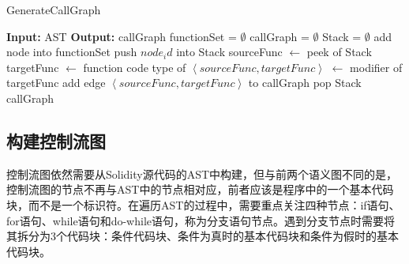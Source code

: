 \begin{algorithm}
    \caption{GenerateCallGraph}
    \label{alg:gen_callgraph}
    \begin{algorithmic}[1]
        \State \textbf{Input:} AST
        \State \textbf{Output:} callGraph
        \State functionSet = $\emptyset$
        \State callGraph = $\emptyset$
        \State Stack = $\emptyset$
                \State add node into functionSet
                \State push $node_id$ into Stack
                    \State sourceFunc $\gets$ peek of Stack
                    \State targetFunc $\gets$ function code
                    \State type of $\left\langle sourceFunc,targetFunc\right\rangle$ $\gets$ modifier of targetFunc
                    \State add edge  $\left\langle sourceFunc,targetFunc\right\rangle$ to callGraph
                \EndIf
            \EndIf
                \State {}
            \EndFor
                \State pop Stack
            \EndIf
        \EndFunction
        \State {}
        \State \Return callGraph
    \end{algorithmic}
    \end{algorithm}

\subsection{构建控制流图}
\label{sec:构建控制流图}
控制流图依然需要从Solidity源代码的AST中构建，但与前两个语义图不同的是，控制流图的节点不再与AST中的节点相对应，前者应该是程序中的一个基本代码块，而不是一个标识符。在遍历AST的过程中，需要重点关注四种节点：if语句、for语句、while语句和do-while语句，称为分支语句节点。遇到分支节点时需要将其拆分为3个代码块：条件代码块、条件为真时的基本代码块和条件为假时的基本代码块。


